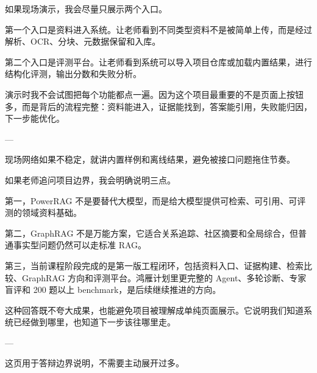 \documentclass[10pt, a4paper]{ctexart}
\begin{document}
\begin{tcolorbox}[colback=white, colframe=primary!35, title={\textbf{第 18 页：现场演示只展示关键入口}}, beforeafter skip=2.0pt]
\begin{minipage}[t]{0.72\textwidth}
  \linespread{1.0}\selectfont\footnotesize
  如果现场演示，我会尽量只展示两个入口。

第一个入口是资料进入系统。让老师看到不同类型资料不是被简单上传，而是经过解析、OCR、分块、元数据保留和入库。

第二个入口是评测平台。让老师看到系统可以导入项目仓库或加载内置结果，进行结构化评测，输出分数和失败分析。

演示时我不会试图把每个功能都点一遍。因为这个项目最重要的不是页面上按钮多，而是背后的流程完整：资料能进入，证据能找到，答案能引用，失败能归因，下一步能优化。

---
\end{minipage}
\hfill
\begin{minipage}[t]{0.25\textwidth}
  \fontsize{7.5}{9.5}\selectfont
  \begin{tcolorbox}[colback=orange!5, colframe=orange!45, title=\textbf{讲述重点}, left=0.6mm, right=0.6mm, top=0.8mm, bottom=0.8mm, arc=0.8mm, boxrule=0.4pt, beforeafter skip=0pt]
    现场网络如果不稳定，就讲内置样例和离线结果，避免被接口问题拖住节奏。
  \end{tcolorbox}
\end{minipage}
\end{tcolorbox}

\begin{tcolorbox}[colback=white, colframe=primary!35, title={\textbf{第 19 页：答辩时要稳住边界}}, beforeafter skip=2.0pt]
\begin{minipage}[t]{0.72\textwidth}
  \linespread{1.0}\selectfont\footnotesize
  如果老师追问项目边界，我会明确说明三点。

第一，PowerRAG 不是要替代大模型，而是给大模型提供可检索、可引用、可评测的领域资料基础。

第二，GraphRAG 不是万能方案，它适合关系追踪、社区摘要和全局综合，但普通事实型问题仍然可以走标准 RAG。

第三，当前课程阶段完成的是第一版工程闭环，包括资料入口、证据构建、检索比较、GraphRAG 方向和评测平台。鸿雁计划里更完整的 Agent、多轮诊断、专家盲评和 200 题以上 benchmark，是后续继续推进的方向。

这种回答既不夸大成果，也能避免项目被理解成单纯页面展示。它说明我们知道系统已经做到哪里，也知道下一步该往哪里走。

---
\end{minipage}
\hfill
\begin{minipage}[t]{0.25\textwidth}
  \fontsize{7.5}{9.5}\selectfont
  \begin{tcolorbox}[colback=orange!5, colframe=orange!45, title=\textbf{讲述重点}, left=0.6mm, right=0.6mm, top=0.8mm, bottom=0.8mm, arc=0.8mm, boxrule=0.4pt, beforeafter skip=0pt]
    这页用于答辩边界说明，不需要主动展开过多。
  \end{tcolorbox}
\end{minipage}
\end{tcolorbox}
\end{document}
